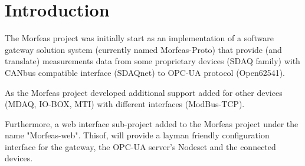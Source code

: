 \section{Introduction}
The Morfeas project was initially start as an implementation of a software gateway solution system
(currently named Morfeas-Proto) that provide (and translate) measurements data from some proprietary devices (SDAQ family)
with CANbus compatible interface (SDAQnet) to OPC-UA protocol (Open62541).

As the Morfeas project developed additional support added for other devices (MDAQ, IO-BOX, MTI) with different interfaces (ModBus-TCP).

Furthermore, a web interface sub-project added to the Morfeas project under the name "Morfeas-web".
Thisof, will provide a layman friendly configuration interface for the gateway, the OPC-UA server's Nodeset and the connected devices.